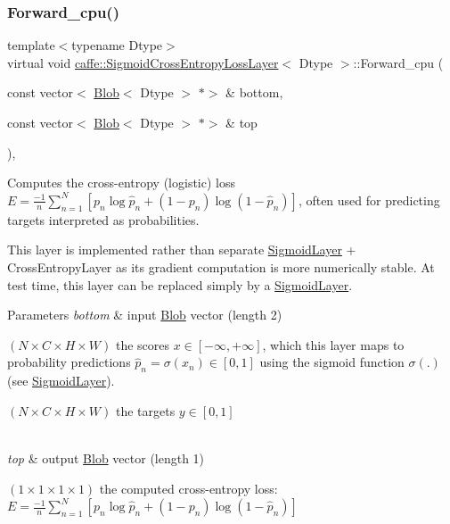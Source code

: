 \subsubsection{\texorpdfstring{Forward\+\_\+cpu()}{Forward\_cpu()}\hspace{0.1cm}{\footnotesize\ttfamily [1/2]}}
{\footnotesize\ttfamily template$<$typename Dtype$>$ \\
virtual void \mbox{\hyperlink{classcaffe_1_1_sigmoid_cross_entropy_loss_layer}{caffe\+::\+Sigmoid\+Cross\+Entropy\+Loss\+Layer}}$<$ Dtype $>$\+::Forward\+\_\+cpu (\begin{DoxyParamCaption}\item[{const vector$<$ \mbox{\hyperlink{classcaffe_1_1_blob}{Blob}}$<$ Dtype $>$ $\ast$$>$ \&}]{bottom,  }\item[{const vector$<$ \mbox{\hyperlink{classcaffe_1_1_blob}{Blob}}$<$ Dtype $>$ $\ast$$>$ \&}]{top }\end{DoxyParamCaption})\hspace{0.3cm}{\ttfamily [protected]}, {\ttfamily [virtual]}}



Computes the cross-\/entropy (logistic) loss $ E = \frac{-1}{n} \sum\limits_{n=1}^N \left[ p_n \log \hat{p}_n + (1 - p_n) \log(1 - \hat{p}_n) \right] $, often used for predicting targets interpreted as probabilities. 

This layer is implemented rather than separate \mbox{\hyperlink{classcaffe_1_1_sigmoid_layer}{Sigmoid\+Layer}} + Cross\+Entropy\+Layer as its gradient computation is more numerically stable. At test time, this layer can be replaced simply by a \mbox{\hyperlink{classcaffe_1_1_sigmoid_layer}{Sigmoid\+Layer}}.


\begin{DoxyParams}{Parameters}
{\em bottom} & input \mbox{\hyperlink{classcaffe_1_1_blob}{Blob}} vector (length 2)
\begin{DoxyEnumerate}
\item $ (N \times C \times H \times W) $ the scores $ x \in [-\infty, +\infty]$, which this layer maps to probability predictions $ \hat{p}_n = \sigma(x_n) \in [0, 1] $ using the sigmoid function $ \sigma(.) $ (see \mbox{\hyperlink{classcaffe_1_1_sigmoid_layer}{Sigmoid\+Layer}}).
\item $ (N \times C \times H \times W) $ the targets $ y \in [0, 1] $ 
\end{DoxyEnumerate}\\
\hline
{\em top} & output \mbox{\hyperlink{classcaffe_1_1_blob}{Blob}} vector (length 1)
\begin{DoxyEnumerate}
\item $ (1 \times 1 \times 1 \times 1) $ the computed cross-\/entropy loss\+: $ E = \frac{-1}{n} \sum\limits_{n=1}^N \left[ p_n \log \hat{p}_n + (1 - p_n) \log(1 - \hat{p}_n) \right] $ 
\end{DoxyEnumerate}\\
\hline
\end{DoxyParams}



